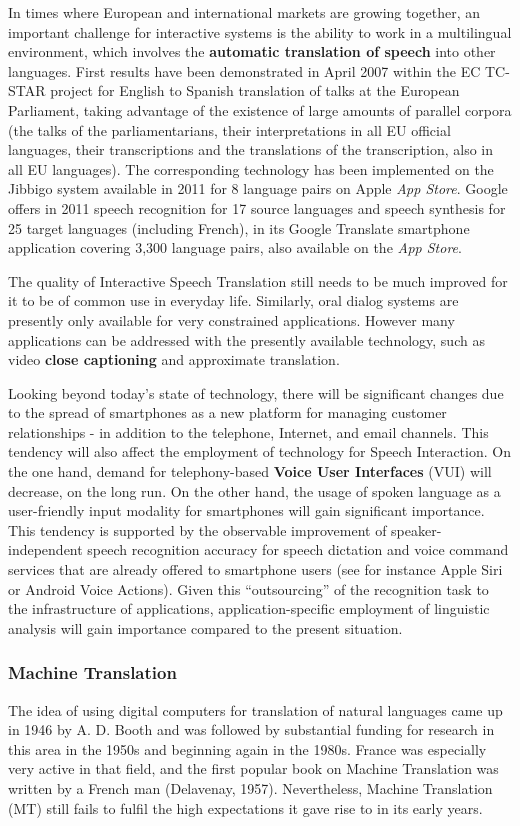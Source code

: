 \begin{multicols}{2}
In times where European and international markets are growing
together, an important challenge for interactive systems is the
ability to work in a multilingual environment, which involves the
{\bf automatic translation of speech} into other languages. First results
have been demonstrated in April 2007 within the EC TC-STAR\cite{tcstarurl} project
for English to Spanish translation of talks at the European
Parliament, taking advantage of the existence of large amounts of
parallel corpora (the talks of the parliamentarians, their
interpretations in all EU official languages, their transcriptions and
the translations of the transcription, also in all EU languages). The
corresponding technology has been implemented on the Jibbigo\cite{jibbigo} system
available in 2011 for 8 language pairs on Apple {\em App Store}. Google offers
in 2011 speech recognition for 17 source languages and speech synthesis
for 25 target languages (including French), in its Google Translate
smartphone application covering 3,300 language pairs, also available
on the {\em App Store}.

The quality of Interactive Speech Translation still needs to be much
improved for it to be of common use in everyday life. Similarly, oral
dialog systems are presently only available for very constrained
applications. However many applications can be addressed with the
presently available technology, such as video {\bf close captioning}
and approximate translation.

Looking beyond today's state of technology, there will be
significant changes due to the spread of smartphones as a new platform
for managing customer relationships - in addition to the telephone,
Internet, and email channels. This tendency will also affect the
employment of technology for Speech Interaction. On the one hand,
demand for telephony-based {\bf Voice User Interfaces} (VUI) will
decrease, on the long run. On the other hand, the usage of spoken
language as a user-friendly input modality for smartphones will gain
significant importance. This tendency is supported by the observable
improvement of speaker-independent speech recognition accuracy for
speech dictation and voice command services that are already offered
to smartphone users (see for instance Apple Siri or Android Voice
Actions). Given this ``outsourcing'' of the recognition
task to the infrastructure of applications, application-specific
employment of linguistic analysis will gain importance compared to the
present situation.

\subsubsection{Machine Translation}
The idea of using digital computers for translation of natural
languages came up in 1946 by A. D. Booth and was followed by
substantial funding for research in this area in the 1950s and
beginning again in the 1980s. France was especially very active in
that field, and the first popular book on Machine Translation was
written by a French man (Delavenay, 1957). Nevertheless, Machine
Translation (MT) still fails to fulfil the high expectations it gave
rise to in its early years.


\end{multicols}
